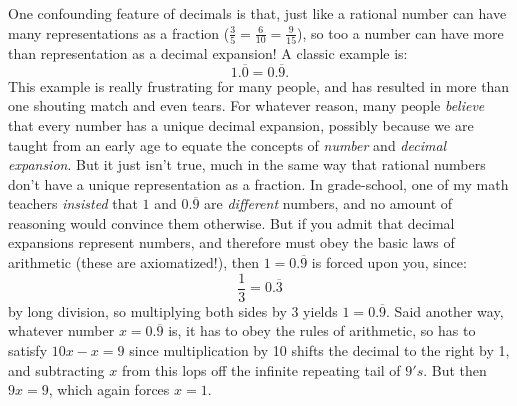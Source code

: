\documentclass[11pt,oneside]{amsart}
\begin{document}
One confounding feature of decimals is that, just like a rational number can have many representations as a fraction ($\frac{3}{5} =\frac{6}{10}= \frac{9}{15}$),
so too a number can have more than representation as a decimal expansion!  A classic example is:
\[
  1.\overline{0} = 0.\overline{9}.
\]
This example is really frustrating for many people, and has resulted in more than one shouting match and even tears. 
For whatever reason, many people {\em believe} that every number has a unique decimal expansion, possibly because
we are taught from an early age to equate the concepts of {\em number} and {\em decimal expansion}.  But it just isn't true,
much in the same way that rational numbers don't have a unique representation as a fraction.  In grade-school, one of my math teachers
{\em insisted} that $1$ and $0.\overline{9}$ are {\em different} numbers, and no amount of reasoning would convince them otherwise.  But if you
admit that decimal expansions represent numbers, and therefore must obey the basic laws of arithmetic (these are axiomatized!), then
$1=0.\overline{9}$ is forced upon you, since:
\[
\frac{1}{3} = 0.\overline{3}
\]
by long division, so multiplying both sides by 3 yields $1=0.\overline{9}$.  
Said another way, whatever number $x=0.\overline{9}$
is, it has to obey the rules of arithmetic, so has to satisfy $10x - x = 9$ since multiplication by 10 shifts the decimal to the right by 1, 
and subtracting $x$ from this lops off the infinite repeating tail of $9's$.  But then $9x=9$, which again forces $x=1$.
\end{document}
